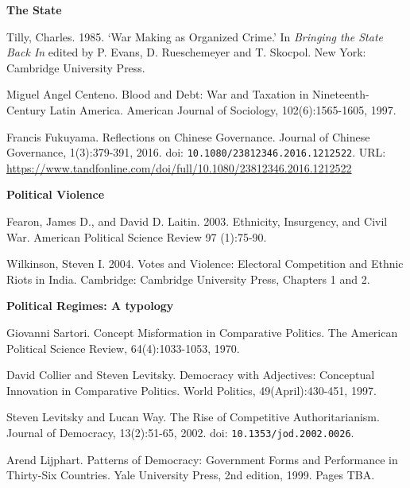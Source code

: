 \documentclass[letterpaper]{article}
\renewenvironment{itemize}{
  \begin{list}{}{
    \setlength{\leftmargin}{1.5em}
  }
}{
  \end{list}
}
\begin{document}
\begin{enumerate}

\item {\bf The State}
	\begin{itemize}
		\item[$\bullet$] Tilly, Charles. 1985. `War Making as Organized Crime.' In \emph{Bringing the State Back In} edited by P. Evans, D. Rueschemeyer and T. Skocpol. New York: Cambridge University Press.
		\item[$\bullet$] Miguel Angel Centeno. Blood and Debt: War and Taxation in Nineteenth-Century Latin America. American Journal of Sociology, 102(6):1565-1605, 1997.
		\item[$\bullet$] Francis Fukuyama. Reflections on Chinese Governance. Journal of Chinese Governance, 1(3):379-391, 2016. doi: \texttt{10.1080/23812346.2016.1212522}. URL: \url{https://www.tandfonline.com/doi/full/10.1080/23812346.2016.1212522}

	\end{itemize}



\item {\bf Political Violence}
	\begin{itemize}
		\item[$\bullet$] Fearon, James D., and David D. Laitin. 2003. Ethnicity, Insurgency, and Civil War. American Political Science Review 97 (1):75-90.
		\item[$\bullet$] Wilkinson, Steven I. 2004. Votes and Violence: Electoral Competition and Ethnic Riots in India. Cambridge: Cambridge University Press, Chapters 1 and 2.
	\end{itemize}


\item {\bf Political Regimes: A typology}
	\begin{itemize}
		\item[$\bullet$] Giovanni Sartori. Concept Misformation in Comparative Politics. The American Political Science Review, 64(4):1033-1053, 1970.
		\item[$\bullet$] David Collier and Steven Levitsky. Democracy with Adjectives: Conceptual Innovation in Comparative Politics. World Politics, 49(April):430-451, 1997.
		\item[$\bullet$] Steven Levitsky and Lucan Way. The Rise of Competitive Authoritarianism. Journal of Democracy, 13(2):51-65, 2002. doi: \texttt{10.1353/jod.2002.0026}.
		\item[$\bullet$] Arend Lijphart. Patterns of Democracy: Government Forms and Performance in Thirty-Six Countries. Yale University Press, 2nd edition, 1999. Pages TBA.
	\end{itemize}




\end{enumerate}
\end{document}

